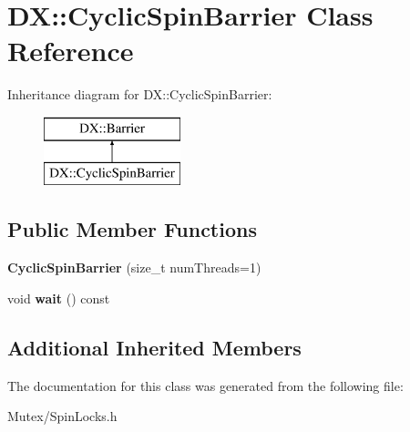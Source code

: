 \hypertarget{class_d_x_1_1_cyclic_spin_barrier}{\section{D\-X\-:\-:Cyclic\-Spin\-Barrier Class Reference}
\label{class_d_x_1_1_cyclic_spin_barrier}
}
Inheritance diagram for D\-X\-:\-:Cyclic\-Spin\-Barrier\-:\begin{figure}[H]
\begin{center}
\leavevmode
\includegraphics[height=2.000000cm]{class_d_x_1_1_cyclic_spin_barrier}
\end{center}
\end{figure}
\subsection*{Public Member Functions}
\begin{DoxyCompactItemize}
\item 
\hypertarget{class_d_x_1_1_cyclic_spin_barrier_a5450fa600f1c497b4c08d69a0df49929}{{\bfseries Cyclic\-Spin\-Barrier} (size\-\_\-t num\-Threads=1)}\label{class_d_x_1_1_cyclic_spin_barrier_a5450fa600f1c497b4c08d69a0df49929}

\item 
\hypertarget{class_d_x_1_1_cyclic_spin_barrier_abdb6dfc6f2146dce6bcf39718a6f92e5}{void {\bfseries wait} () const }\label{class_d_x_1_1_cyclic_spin_barrier_abdb6dfc6f2146dce6bcf39718a6f92e5}

\end{DoxyCompactItemize}
\subsection*{Additional Inherited Members}


The documentation for this class was generated from the following file\-:\begin{DoxyCompactItemize}
\item 
Mutex/Spin\-Locks.\-h\end{DoxyCompactItemize}

